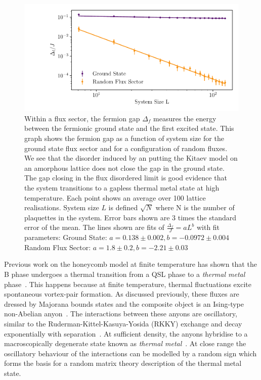 \hypertarget{fig:fermion_gap_vs_L}{%
\begin{figure}
\centering
\includegraphics[width=1\textwidth,height=\textheight]{figure_code/amk_chapter/results/fermion_gap_vs_L/fermion_gap_vs_L}
\caption[{Finite Size Scaling of the Fermion Gap}]{Within a flux sector, the fermion gap \(\Delta_f\) measures the energy between the fermionic ground state and the first excited state. This graph shows the fermion gap as a function of system size for the ground state flux sector and for a configuration of random fluxes. We see that the disorder induced by an putting the Kitaev model on an amorphous lattice does not close the gap in the ground state. The gap closing in the flux disordered limit is good evidence that the system transitions to a gapless thermal metal state at high temperature. Each point shows an average over 100 lattice realisations. System size \(L\) is defined \(\sqrt{N}\) where N is the number of plaquettes in the system. Error bars shown are \(3\) times the standard error of the mean. The lines shown are fits of \(\tfrac{\Delta_f}{J} = aL ^ b\) with fit parameters: Ground State: \(a = 0.138 \pm 0.002, b = -0.0972 \pm 0.004\) Random Flux Sector: \(a = 1.8 \pm 0.2, b = -2.21 \pm 0.03\)}
\label{fig:fermion_gap_vs_L}
\end{figure}
}

Previous work on the honeycomb model at finite temperature has shown that the B phase undergoes a thermal transition from a QSL phase to a \emph{thermal metal} phase~\autocite{selfThermallyInducedMetallic2019}. This happens because at finite temperature, thermal fluctuations excite spontaneous vortex-pair formation. As discussed previously, these fluxes are dressed by Majorana bounds states and the composite object is an Ising-type non-Abelian anyon~\autocite{Beenakker2013}. The interactions between these anyons are oscillatory, similar to the Ruderman-Kittel-Kasuya-Yosida (RKKY) exchange and decay exponentially with separation~\autocite{Laumann2012,Lahtinen_2011,lahtinenTopologicalLiquidNucleation2012}. At sufficient density, the anyons hybridise to a macroscopically degenerate state known as \emph{thermal metal}~\autocite{Laumann2012}. At close range the oscillatory behaviour of the interactions can be modelled by a random sign which forms the basis for a random matrix theory description of the thermal metal state.

